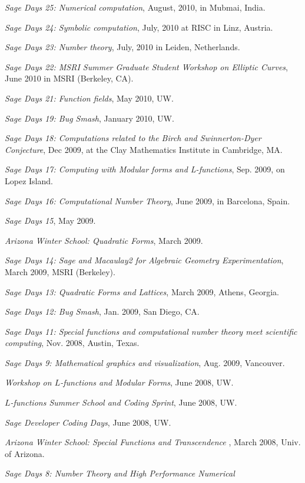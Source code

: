 \documentclass[10pt]{article}
\newcounter{totalnumworkshops}
\newenvironment{workshops}
   {
   \begin{revnumerate}[\value{totalnumworkshops}]
   {}
         {
            \setlength{\itemsep}{.5ex}
            \setlength{\parsep}{0ex}
            \setlength{\leftmargin}{0em}
            \setlength{\parskip}{0ex}
            \setlength{\topsep}{0ex}
         }
   }
   {
\end{revnumerate}
   }
\newcommand{\marginlabel}[1]{
\begin{minipage}[b]{0.8\labelwidth}{\large \textsf{\textbf{#1}}}\end{minipage}}
\newcommand{\entrylabel}[1]{\mbox{\marginlabel{#1}}\hfill}
\newcommand{\MainListlabel}[1]
   {
      \parbox[t]{\labelwidth}{\hspace{.8em}\marginlabel{#1}}
   }
\newenvironment{MainList}[1]
   {
      \renewcommand{\entrylabel}{\MainListlabel}
      \begin{list}{}
      {
         \renewcommand{\makelabel}{\entrylabel}
         \setlength   {\itemindent}{-.65em}
         \setlength   {\labelwidth}{#1}
         \setlength   {\leftmargin}{\labelwidth}
         \setlength   {\itemsep}{3ex}
      }
   }
   {
      \end{list}
   }
\begin{document}
\begin{MainList}{88pt}
\begin{workshops}
\item {\em Sage Days 25: Numerical computation}, August, 2010, in Mubmai, India.
\item {\em Sage Days 24: Symbolic computation}, July, 2010 at RISC in Linz, Austria.
\item {\em Sage Days 23: Number theory}, July, 2010 in Leiden, Netherlands.
\item {\em Sage Days 22: MSRI Summer Graduate Student Workshop on Elliptic Curves}, June 2010 in
MSRI (Berkeley, CA).
\item {\em Sage Days 21: Function fields}, May 2010, UW.
\item {\em Sage Days 19: Bug Smash}, January 2010, UW.
\item {\em Sage Days 18: Computations related to the Birch and Swinnerton-Dyer Conjecture},
  Dec 2009, at the Clay Mathematics Institute in Cambridge, MA.
\item {\em Sage Days 17: Computing with Modular forms and L-functions}, Sep. 2009, on Lopez Island.
\item {\em Sage Days 16: Computational Number Theory}, June 2009, in Barcelona, Spain.
\item {\em Sage Days 15}, May 2009.
\item {\em Arizona Winter School: Quadratic Forms}, March 2009.
\item {\em Sage Days 14: Sage and Macaulay2 for Algebraic Geometry Experimentation}, March 2009,
MSRI (Berkeley).
\item {\em Sage Days 13: Quadratic Forms and Lattices}, March 2009, Athens, Georgia.
\item {\em Sage Days 12: Bug Smash}, Jan. 2009, San Diego, CA.
\item {\em Sage Days 11: Special functions and computational number theory meet scientific computing}, Nov. 2008, Austin, Texas.
\item {\em Sage Days 9: Mathematical graphics and visualization}, Aug. 2009, Vancouver.
\item {\em Workshop on $L$-functions and Modular Forms}, June 2008, UW.
\item {\em $L$-functions Summer School and Coding Sprint}, June 2008, UW.
\item {\em Sage Developer Coding Days}, June 2008, UW.
\item {\em Arizona Winter School: Special Functions and Transcendence },
    March 2008, Univ. of Arizona.
\item {\em Sage Days 8: Number Theory and High Performance Numerical
}
\end{workshops}
\end{MainList}
\end{document}
